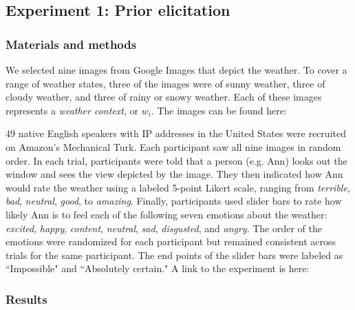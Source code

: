 \documentclass[10pt,letterpaper]{article}
\begin{document}
\subsection{Experiment 1: Prior elicitation}
\subsubsection{Materials and methods}
We selected nine images from Google Images that depict the weather. To cover a range of weather states, three of the images were of sunny weather, three of cloudy weather, and three of rainy or snowy weather. Each of these images represents a \emph{weather context}, or $w_i$. The images can be found here:

$49$ native English speakers with IP addresses in the United States were recruited on Amazon's Mechanical Turk. Each participant saw all nine images in random order. In each trial, participants were told that a person (e.g. Ann) looks out the window and sees the view depicted by the image. They then indicated how Ann would rate the weather using a labeled 5-point Likert scale, ranging from \emph{terrible}, \emph{bad}, \emph{neutral}, \emph{good}, to \emph{amazing}. Finally, participants used slider bars to rate how likely Ann is to feel each of the following seven emotions about the weather: \emph{excited}, \emph{happy}, \emph{content}, \emph{neutral}, \emph{sad}, \emph{disgusted}, and \emph{angry}. The order of the emotions were randomized for each participant but remained consistent across trials for the same participant. The end points of the slider bars were labeled as ``Impossible" and ``Absolutely certain." A link to the experiment is here:
  
\subsubsection{Results}
\begin{figure}[t]
\end{figure}
\end{document}
